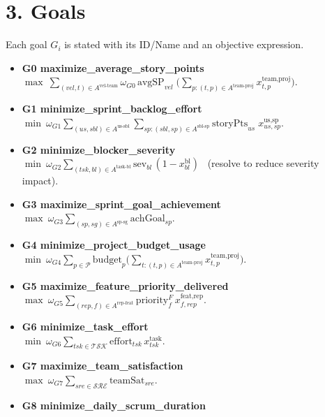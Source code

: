 \documentclass[11pt,a4paper]{article}
\begin{document}
\section{3. Goals}
\noindent Each goal $G_i$ is stated with its ID/Name and an objective expression.\par
\begin{itemize}
  \item \textbf{G0 maximize\_average\_story\_points}\\
  $\displaystyle \max \ \sum_{(vel,t)\in A^{\text{vel-team}}} \omega_{G0}\,\text{avgSP}_{vel}\;\Big(\sum_{p:(t,p)\in A^{\text{team-proj}}} x^{\text{team,proj}}_{t,p}\Big)$.
  \item \textbf{G1 minimize\_sprint\_backlog\_effort}\\
  $\displaystyle \min \ \omega_{G1}\sum_{(us,sbl)\in A^{\text{us-sbl}}}\sum_{sp:(sbl,sp)\in A^{\text{sbl-sp}}} \text{storyPts}_{us}\; x^{\text{us,sp}}_{us,sp}$.
  \item \textbf{G2 minimize\_blocker\_severity}\\
  $\displaystyle \min \ \omega_{G2}\sum_{(tsk,bl)\in A^{\text{task-bl}}} \text{sev}_{bl}\,(1 - x^{\text{bl}}_{bl})$ \ (resolve to reduce severity impact).
  \item \textbf{G3 maximize\_sprint\_goal\_achievement}\\
  $\displaystyle \max \ \omega_{G3}\sum_{(sp,sg)\in A^{\text{sp-sg}}}\text{achGoal}_{sp}$.
  \item \textbf{G4 minimize\_project\_budget\_usage}\\
  $\displaystyle \min \ \omega_{G4}\sum_{p\in\mathcal{P}} \text{budget}_p \Big(\sum_{t:(t,p)\in A^{\text{team-proj}}} x^{\text{team,proj}}_{t,p}\Big)$.
  \item \textbf{G5 maximize\_feature\_priority\_delivered}\\
  $\displaystyle \max \ \omega_{G5}\sum_{(rep,f)\in A^{\text{rep-feat}}} \text{priority}^F_f \, x^{\text{feat,rep}}_{f,rep}$.
  \item \textbf{G6 minimize\_task\_effort}\\
  $\displaystyle \min \ \omega_{G6}\sum_{tsk\in\mathcal{TSK}} \text{effort}_{tsk}\, x^{\text{task}}_{tsk}$.
  \item \textbf{G7 maximize\_team\_satisfaction}\\
  $\displaystyle \max \ \omega_{G7}\sum_{sre\in\mathcal{SRE}}\text{teamSat}_{sre}$.
  \item \textbf{G8 minimize\_daily\_scrum\_duration}\\

\end{itemize}
\end{document}
